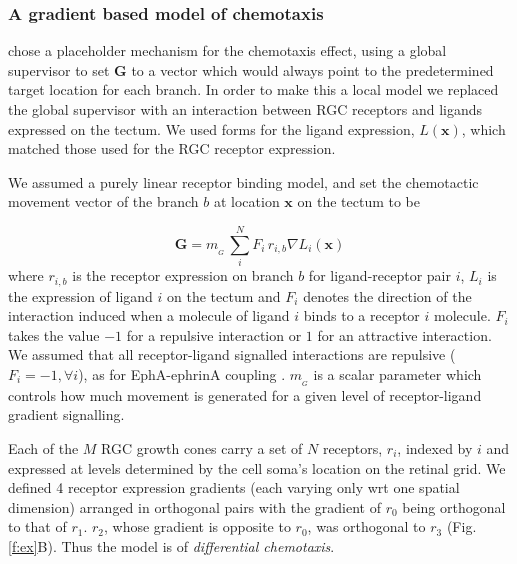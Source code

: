 \documentclass[9pt]{elife} %
\begin{document}
\subsubsection*{A gradient based model of chemotaxis}


\citet{simpson_simple_2011} chose a placeholder mechanism for the chemotaxis effect, using a global supervisor to set $\mathbf{G}$ to a vector which would always point to the predetermined target location for each branch.
In order to make this a local model we replaced the global supervisor with an interaction between RGC receptors and ligands expressed on the tectum. We used forms for the ligand expression, $L(\mathbf{x})$, which matched those used for the RGC receptor expression.

We assumed a purely linear receptor binding model, and set the chemotactic movement vector of the branch $b$ at location $\mathbf{x}$ on the tectum to be

\begin{equation}\label{e:G}
\mathbf{G} = m_{\!_G}\,\sum_i^N F_i\,r_{i,b} \nabla L_i(\mathbf{x})
\end{equation}
%
where $r_{i,b}$ is the receptor expression on branch $b$ for ligand-receptor pair $i$, $L_i$ is the expression of ligand $i$ on the tectum and $F_i$ denotes the direction of the interaction induced when a molecule of ligand $i$ binds to a receptor $i$ molecule.
$F_i$ takes the value $-1$ for a repulsive interaction or $1$ for an attractive interaction.
%
We assumed that all receptor-ligand signalled interactions are repulsive ($F_i=-1, \forall i$), as for EphA-ephrinA coupling \citep{drescher_vitro_1995,nakamoto_topographically_1996}.
%
$m_{\!_G}$ is a scalar parameter which controls how much movement is generated for a given level of receptor-ligand gradient signalling.

Each of the $M$ RGC growth cones carry a set of $N$ receptors, $r_i$, indexed by $i$ and expressed at levels determined by the cell soma's location on the retinal grid.
%
%
We defined 4 receptor expression gradients (each varying only wrt one spatial dimension) arranged in orthogonal pairs with the gradient of $r_0$ being orthogonal to that of $r_1$. $r_2$, whose gradient is opposite to $r_0$, was orthogonal to $r_3$ (Fig.\,\ref{f:ex}B). Thus the model is of \emph{differential chemotaxis}.
\end{document}

